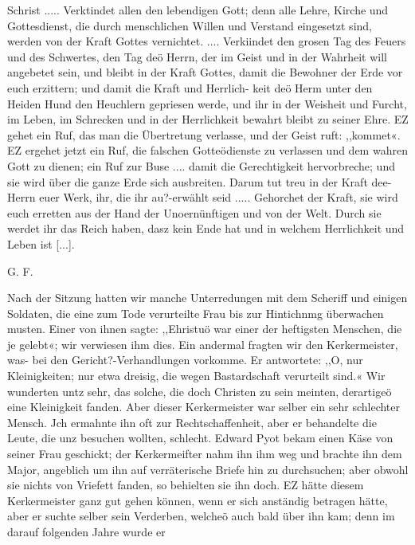 {    %
    Schrist ..... Verktindet allen den lebendigen Gott; denn alle
    Lehre, Kirche und Gottesdienst, die durch menschlichen Willen und
    Verstand eingesetzt sind, werden von der Kraft Gottes vernichtet.
    .... Verkiindet den grosen Tag des Feuers und des Schwertes,
    den Tag deö Herrn, der im Geist und in der Wahrheit will
    angebetet sein, und bleibt in der Kraft Gottes, damit die Bewohner
    der Erde vor euch erzittern; und damit die Kraft und Herrlich-
    keit deö Herm unter den Heiden Hund den Heuchlern gepriesen
    werde, und ihr in der Weisheit und Furcht, im Leben, im Schrecken
    und in der Herrlichkeit bewahrt bleibt zu seiner Ehre. EZ gehet
    ein Ruf, das man die Übertretung verlasse, und der Geist ruft:
    ,,kommet«. EZ ergehet jetzt ein Ruf, die falschen Gotteödienste
    zu verlassen und dem wahren Gott zu dienen; ein Ruf zur
    Buse .... damit die Gerechtigkeit hervorbreche; und sie wird
    über die ganze Erde sich ausbreiten. Darum tut treu in der
    Kraft dee- Herrn euer Werk, ihr, die ihr au?-erwählt seid .....
    Gehorchet der Kraft, sie wird euch erretten aus der Hand der
    Unoernünftigen und von der Welt. Durch sie werdet ihr das
    Reich haben, dasz kein Ende hat und in welchem Herrlichkeit und
    Leben ist [...]. 

\begin{flushright}G. F.\end{flushright}

}


Nach der Sitzung hatten wir manche Unterredungen mit dem
Scheriff und einigen Soldaten, die eine zum Tode verurteilte Frau
bis zur Hintichnmg überwachen musten. Einer von ihnen sagte:
,,Ehristuö war einer der heftigsten Menschen, die je gelebt«; wir
verwiesen ihm dies. Ein andermal fragten wir den Kerkermeister,
was- bei den Gericht?-Verhandlungen vorkomme. Er antwortete:
,,O, nur Kleinigkeiten; nur etwa dreisig, die wegen Bastardschaft
verurteilt sind.« Wir wunderten untz sehr, das solche, die doch
Christen zu sein meinten, derartigeö eine Kleinigkeit fanden.
Aber dieser Kerkermeister war selber ein sehr schlechter Mensch.
Jch ermahnte ihn oft zur Rechtschaffenheit, aber er behandelte
die Leute, die unz besuchen wollten, schlecht. Edward Pyot bekam
einen Käse von seiner Frau geschickt; der Kerkermeifter nahm ihn
ihm weg und brachte ihn dem Major, angeblich um ihn auf
verräterische Briefe hin zu durchsuchen; aber obwohl sie nichts
von Vriefett fanden, so behielten sie ihn doch. EZ hätte diesem
Kerkermeister ganz gut gehen können, wenn er sich anständig
betragen hätte, aber er suchte selber sein Verderben, welcheö auch
bald über ihn kam; denn im darauf folgenden Jahre wurde er


